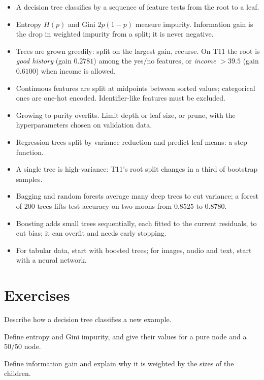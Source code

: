 \begin{itemize}
  \item A decision tree classifies by a sequence of feature tests from the root to
        a leaf.
  \item Entropy $H(p)$ and Gini $2p(1-p)$ measure impurity. Information gain is
        the drop in weighted impurity from a split; it is never negative.
  \item Trees are grown greedily: split on the largest gain, recurse. On T11 the
        root is \emph{good history} (gain $0.2781$) among the yes/no features,
        or \emph{income $> 39.5$} (gain $0.6100$) when income is allowed.
  \item Continuous features are split at midpoints between sorted values;
        categorical ones are one-hot encoded. Identifier-like features must be
        excluded.
  \item Growing to purity overfits. Limit depth or leaf size, or prune, with the
        hyperparameters chosen on validation data.
  \item Regression trees split by variance reduction and predict leaf means: a
        step function.
  \item A single tree is high-variance: T11's root split changes in a third of
        bootstrap samples.
  \item Bagging and random forests average many deep trees to cut variance; a
        forest of $200$ trees lifts test accuracy on two moons from $0.8525$ to
        $0.8780$.
  \item Boosting adds small trees sequentially, each fitted to the current
        residuals, to cut bias; it can overfit and needs early stopping.
  \item For tabular data, start with boosted trees; for images, audio and text,
        start with a neural network.
\end{itemize}

\section*{Exercises}


\sq Describe how a decision tree classifies a new example.

\sq Define entropy and Gini impurity, and give their values for a pure node and a
50/50 node.

\sq Define information gain and explain why it is weighted by the sizes of the
children.

